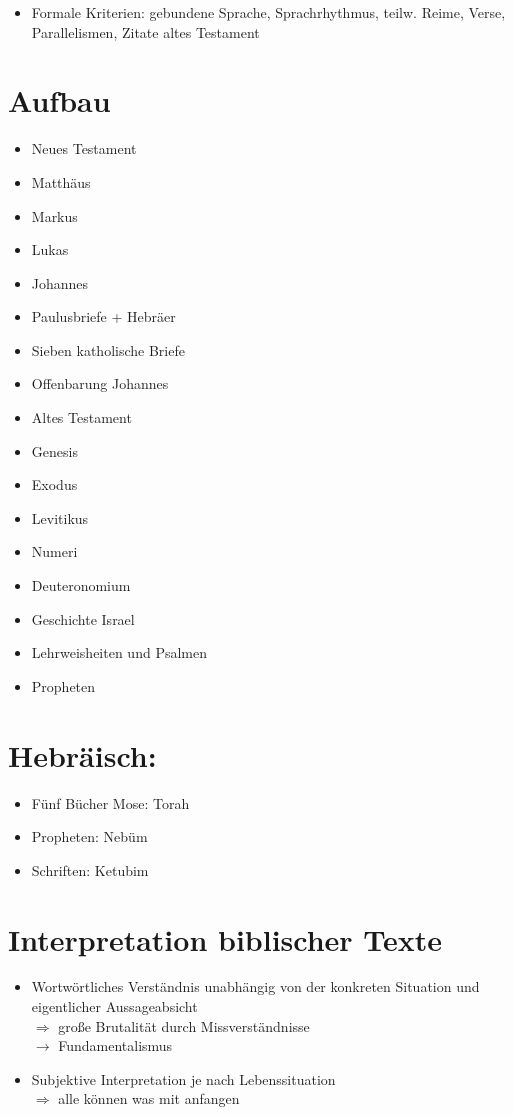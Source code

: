 \documentclass[11pt, paper=a4, twocolumn]{scrartcl}
\begin{document}
	\begin{itemize}
		\item Formale Kriterien: gebundene Sprache, Sprachrhythmus, teilw. Reime, Verse, Parallelismen, Zitate altes Testament
	\end{itemize}

	\section{Aufbau}

	\begin{itemize}
		\item Neues Testament
		\item Matthäus
		\item Markus
		\item Lukas
		\item Johannes
		\item Paulusbriefe + Hebräer
		\item Sieben katholische Briefe
		\item Offenbarung Johannes
		\item Altes Testament
		\item Genesis
		\item Exodus
		\item Levitikus
		\item Numeri
		\item Deuteronomium
		\item Geschichte Israel
		\item Lehrweisheiten und Psalmen
		\item Propheten
	\end{itemize}

	\section{Hebräisch:}

	\begin{itemize}
		\item Fünf Bücher Mose: Torah
		\item Propheten: Nebüm
		\item Schriften: Ketubim
	\end{itemize}

	\section{Interpretation biblischer Texte}

	\begin{itemize}
		\item Wortwörtliches Verständnis unabhängig von der konkreten Situation und eigentlicher Aussageabsicht\\
		$\Rightarrow$ große Brutalität durch Missverständnisse\\
		$\rightarrow$ Fundamentalismus
		\item Subjektive Interpretation je nach Lebenssituation\\
		$\Rightarrow$ alle können was mit anfangen
	\end{itemize}
\end{document}
